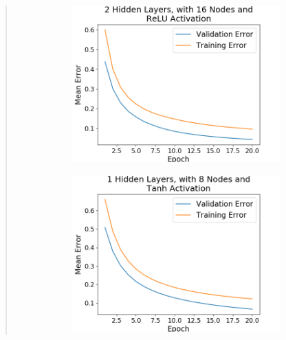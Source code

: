 \documentclass{article}
\begin{document}
\begin{quote}
\begin{figure}[h]
\begin{subfigure}[h]{0.23\textwidth}
	\includegraphics[width=\textwidth]{figs/Cancer_Binary_Classification_2_Hidden_Layers_with_16_Nodes_and_ReLU_Activation.png}
\end{subfigure}
\end{figure}	
\begin{figure}[h!]
\centering
\begin{subfigure}[h]{0.23\textwidth}
	\includegraphics[width=\textwidth]{figs/Cancer_Binary_Classification_1_Hidden_Layers_with_8_Nodes_and_Tanh_Activation.png}
\end{subfigure}
%
\begin{subfigure}[h]{0.23\textwidth}

\end{subfigure}
\end{figure}
\end{quote}
\end{document}
